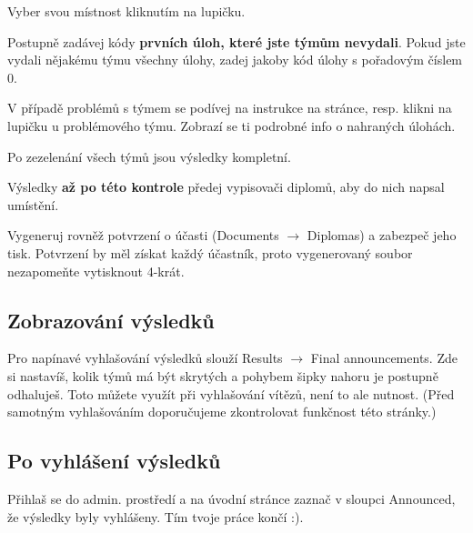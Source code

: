 \documentclass[vyfuk,\classoptions]{fksempty}
\begin{document}
\begin{compactenum}
	\item Vyber svou místnost kliknutím na lupičku.
	\item Postupně zadávej kódy {\bf prvních úloh, které jste týmům nevydali}. Pokud jste vydali nějakému týmu všechny
úlohy, zadej jakoby kód úlohy s pořadovým číslem 0.
	\item V případě problémů s týmem se podívej na instrukce na stránce, resp. klikni na lupičku u problémového týmu.
Zobrazí se ti podrobné info o nahraných úlohách.
	\item Po zezelenání všech týmů jsou výsledky kompletní.
	\item Výsledky \textbf{až po této kontrole} předej vypisovači diplomů, aby do nich napsal umístění.
	\item Vygeneruj rovněž potvrzení o účasti (Documents $\rightarrow$ Diplomas)
a zabezpeč jeho tisk. Potvrzení by měl získat každý účastník,
	proto vygenerovaný soubor nezapomeňte vytisknout 4-krát.
\end{compactenum}

\subsection{Zobrazování výsledků}
Pro napínavé vyhlašování výsledků slouží Results $\rightarrow$ Final announcements. Zde
si nastavíš, kolik týmů má být skrytých a pohybem šipky nahoru je postupně
odhaluješ. Toto můžete využít při vyhlašování vítězů, není to ale nutnost.
(Před samotným vyhlašováním doporučujeme zkontrolovat funkčnost této stránky.)

\subsection{Po vyhlášení výsledků}
Přihlaš se do admin. prostředí a na úvodní stránce zaznač v sloupci Announced,
že výsledky byly vyhlášeny. Tím tvoje práce končí :).
\end{document}
